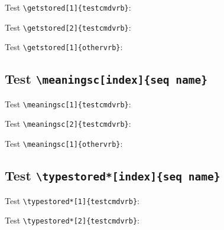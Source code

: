 \documentclass{article}
\begin{document}
\noindent\hrulefill

Test \verb+\getstored[1]{testcmdvrb}+:\par


\noindent\hrulefill

Test \verb+\getstored[2]{testcmdvrb}+:\par


\noindent\hrulefill

Test \verb+\getstored[1]{othervrb}+:\par


\noindent\hrulefill

\subsection{Test \texttt{\textbackslash meaningsc[index]\{seq name\}}}

\noindent\hrulefill

Test \verb+\meaningsc[1]{testcmdvrb}+:\par


\noindent\hrulefill

Test \verb+\meaningsc[2]{testcmdvrb}+:\par


\noindent\hrulefill

Test \verb+\meaningsc[1]{othervrb}+:\par


\noindent\hrulefill

\subsection{Test \texttt{\textbackslash typestored*[index]\{seq name\}}}

\noindent\hrulefill

Test \verb+\typestored*[1]{testcmdvrb}+:\par


\noindent\hrulefill

Test \verb+\typestored*[2]{testcmdvrb}+:\par
\end{document}
